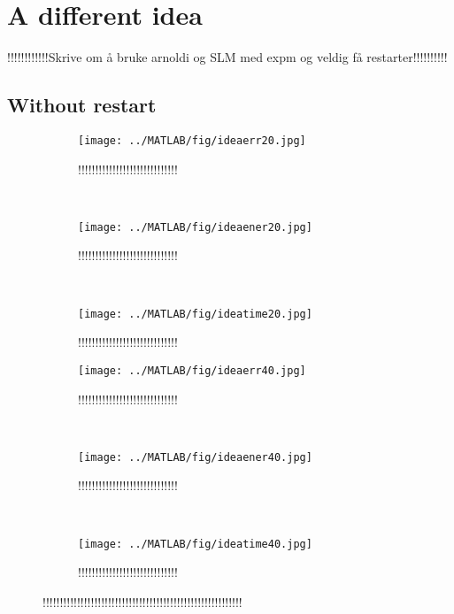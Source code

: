 \section{A different idea} %
!!!!!!!!!!!!Skrive om å bruke arnoldi og SLM med expm og veldig få restarter!!!!!!!!!!\\


\subsection{Without restart} %
\begin{figure}[H]
        \centering
        \begin{subfigure}[b]{0.30\textwidth}
                \texttt{[image: ../MATLAB/fig/ideaerr20.jpg]}
                \caption{ !!!!!!!!!!!!!!!!!!!!!!!!!!!!! }
                \label{fig:ideaerr20}
        \end{subfigure}%
        ~
        \begin{subfigure}[b]{0.30\textwidth}
                \texttt{[image: ../MATLAB/fig/ideaener20.jpg]}
                \caption{ !!!!!!!!!!!!!!!!!!!!!!!!!!!!! }
                \label{fig:ideaener20}
        \end{subfigure}
        ~
        \begin{subfigure}[b]{0.30\textwidth}
                \texttt{[image: ../MATLAB/fig/ideatime20.jpg]}
                \caption{ !!!!!!!!!!!!!!!!!!!!!!!!!!!!! }
                \label{fig:ideatime20}
        \end{subfigure}
        
		\begin{subfigure}[b]{0.30\textwidth}
                \texttt{[image: ../MATLAB/fig/ideaerr40.jpg]}
                \caption{ !!!!!!!!!!!!!!!!!!!!!!!!!!!!! }
                \label{fig:ideaerr40}
        \end{subfigure}%
        ~
        \begin{subfigure}[b]{0.30\textwidth}
                \texttt{[image: ../MATLAB/fig/ideaener40.jpg]}
                \caption{ !!!!!!!!!!!!!!!!!!!!!!!!!!!!! }
                \label{fig:ideaener40}
        \end{subfigure}
        ~
        \begin{subfigure}[b]{0.30\textwidth}
                \texttt{[image: ../MATLAB/fig/ideatime40.jpg]}
                \caption{ !!!!!!!!!!!!!!!!!!!!!!!!!!!!! }
                \label{fig:ideaener40}
        \end{subfigure}
        \caption{!!!!!!!!!!!!!!!!!!!!!!!!!!!!!!!!!!!!!!!!!!!!!!!!!!!!!!!!!!}
        \label{fig:idea0}
\end{figure}


